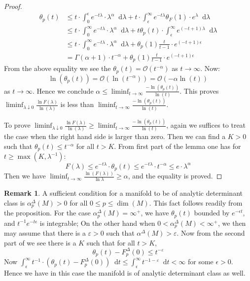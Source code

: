 \documentclass[11pt]{report}
\theoremstyle{definition}
\newtheorem{Rmk}{Remark}[chapter]
\theoremstyle{plain}
\newcommand{\mass}[1]{\mathop{}\mathrm{d}{#1}}
\begin{document}
\begin{proof}
\begin{equation*}
\begin{split}
	\theta_p(t)&\leq t\cdot \int_{0}^{\epsilon}e^{-t\lambda}\cdot \lambda^\alpha\mass{\lambda}+t\cdot \int_{\epsilon}^\infty e^{-t\lambda}\theta_F(1)\cdot e^\lambda\mass{\lambda}\\
	&\leq t\cdot \int_0^\infty e^{-t\lambda}\cdot \lambda^\alpha\mass{\lambda}+t\theta_p(t)\cdot \int_{\epsilon}^{\infty}e^{(-t+1)\lambda}\mass{\lambda}\\
	&\leq t\cdot \int_{0}^{\infty}e^{-t\lambda}\cdot \lambda^\alpha\mass{\lambda}+\theta_p(1)\frac{t}{t-1}\cdot e^{(-t+1)\epsilon}\\
	&=\Gamma(\alpha+1)\cdot t^{-\alpha}+\theta_p(1)\frac{t}{t-1}\cdot e^{(-t+1)\epsilon}
	\end{split}
	\end{equation*}
	From the above equality we see the $\theta_p(t)=\mathcal{O}(t^{-\alpha})$ as $t\to \infty$. Now:
	\begin{equation} 
	\ln(\theta_p(t))=\mathcal{O}(\ln(t^{-\alpha}))=\mathcal{O}(-\alpha\ln(t))
	\end{equation}
	as $t\to \infty$. Hence we conclude $\alpha\leq \liminf_{t\to \infty} \frac{-\ln(\theta_p(t))}{\ln(t)}$. This proves $\liminf_{\lambda\downarrow 0}\frac{\ln F(\lambda)}{\ln(\lambda)}$ is less than $\liminf_{t\to \infty}\frac{-\ln(\theta_p(t))}{\ln(t)}$.
	\par To prove $\liminf_{\lambda\downarrow 0}\frac{\ln F(\lambda)}{\ln(\lambda)}\geq \liminf_{t\to \infty}\frac{-\ln(\theta_p(t))}{\ln(t)}$, again we suffices to treat the case when the right hand side is larger than zero. Then we can find a $K>0$ such that $\theta_p(t)\leq t^{-\alpha}$ for all $t>K$. From first part of the lemma one has for $t\geq\max(K, \lambda^{-1})$:
	\begin{equation*}
	F(\lambda)\leq e^{-t\lambda}\cdot \theta_p(t)\leq e^{-t\lambda}\cdot t^{-\alpha}\leq e\cdot \lambda^\alpha
	\end{equation*}
	Then we have $\liminf_{t\to \infty}\frac{\ln(F(\lambda))}{\ln\lambda}\geq \alpha$, and the equality is proved. 
\end{proof}
\begin{Rmk}
	A sufficient condition for a manifold to be of analytic determinant class is $\alpha^{\Delta}_p(M)>0$ for all $0\leq p\leq \dim(M)$. This fact follows readily from the proposition. For the case $\alpha^\Delta_p(M)=\infty^+$, we have $\theta_p(t)$ bounded by $e^{-\epsilon t}$, and $t^{-1}e^{-t\epsilon}$ is integrable; On the other hand when $0<\alpha^\Delta_p(M)<\infty^+$, we then may assume that there is a $\varepsilon>0$ such that $\alpha^\Delta(M)>\varepsilon$. Now from the second part of  we see there is a $K$ such that for all $t>K$, 
	\begin{equation}
	\theta_p(t)-F^\Delta_p(0)\leq t^{-\varepsilon}
	\end{equation}
	Now $\int_{\epsilon}^{\infty}t^{-1}\cdot(\theta_p(t)-F^\Delta_p(0))\mass{t}\leq \int_{\epsilon}^{\infty}t^{-1-\varepsilon}\mass{t}<\infty$ for some $\epsilon>0$. Hence we have in this case the manifold is of analytic determinant class as well.
\end{Rmk}
\end{document}
